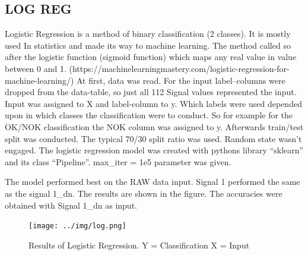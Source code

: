 \documentclass[12pt]{report}
\begin{document}
\subsection{LOG REG}
Logistic Regression is a method of binary classification (2 classes). It is mostly used In statistics and made its way to machine learning. The method called so after the logistic function (sigmoid function) which maps any real value in value between 0 and 1. (https://machinelearningmastery.com/logistic-regression-for-machine-learning/)
\newline
At first, data was read. For the input label–columns were dropped from the data-table, so just all 112 Signal values represented the input. Input was assigned to X and label-column to y. Which labels were used depended upon in which classes the classification were to conduct. So for example for the OK/NOK classification the NOK column was assigned to y. 
\newline
Afterwards train/test split was conducted. The typical 70/30 split ratio was used. Random state wasn’t engaged. The logistic regression model was created with pythons library “sklearn” and its class “Pipeline”. max\_iter = 1e5 parameter was given.\newline



The model performed best on the RAW data input. Signal 1 performed the same as the signal 1\_dn. The results are shown in the figure. The accuracies were obtained with Signal 1\_dn as input.
\begin{figure}[H]
	\centering
	\texttt{[image: ../img/log.png]}
	\caption{Results of Logistic Regression. Y = Classification 
		X = Input 
	}
	\label{fig:log}
\end{figure}
\end{document}
